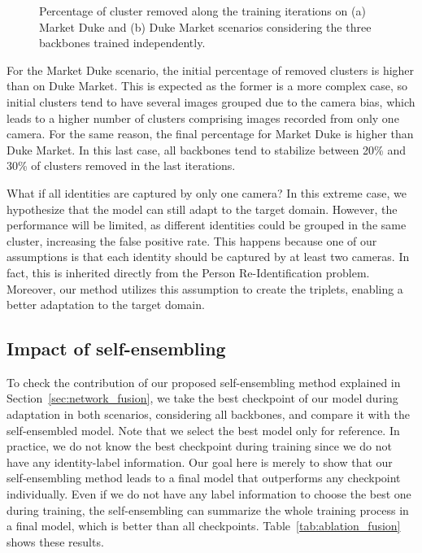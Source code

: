 \documentclass[journal]{IEEEtran}
\begin{document}
\begin{figure}[ht]
\centering
{}
\hfil
{}
\caption{Percentage of cluster removed along the training iterations on (a) Market  Duke and (b) Duke  Market scenarios considering the three backbones trained independently.}
\label{fig:cluster_remotion_progress}
\end{figure}

For the Market  Duke scenario, the initial percentage of removed clusters is higher than on Duke  Market. This is expected as the former is a more complex case, so initial clusters tend to have several images grouped due to the camera bias, which leads to a higher number of clusters comprising images recorded from only one camera. For the same reason, the final percentage for Market  Duke is higher than Duke  Market. In this last case, all backbones tend to stabilize between 20\% and 30\% of clusters removed in the last iterations. 

What if all identities are captured by only one camera? In this extreme case, we hypothesize that the model can still adapt to the target domain. However, the performance will be limited, as different identities could be grouped in the same cluster, increasing the false positive rate. This happens because one of our assumptions is that each identity should be captured by at least two cameras. In fact, this is inherited directly from the Person Re-Identification problem. Moreover, our method utilizes this assumption to create the triplets, enabling a better adaptation to the target domain. 




\subsection{Impact of self-ensembling}

To check the contribution of our proposed self-ensembling method explained in Section~\ref{sec:network_fusion}, we take the best checkpoint of our model during adaptation in both scenarios, considering all backbones, and compare it with the self-ensembled model. Note that we select the best model only for reference. In practice, we do not know the best checkpoint during training since we do not have any identity-label information. Our goal here is merely to show that our self-ensembling method leads to a final model that outperforms any checkpoint individually. Even if we do not have any label information to choose the best one during training, the self-ensembling can summarize the whole training process in a final model, which is better than all checkpoints. Table~\ref{tab:ablation_fusion} shows these results.
\end{document}
